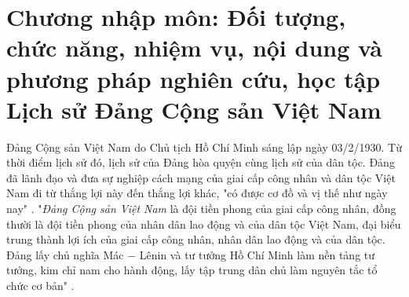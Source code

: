 \chapter{Chương nhập môn: Đối tượng, chức năng, nhiệm vụ, nội dung và phương pháp nghiên cứu, học tập Lịch sử Đảng Cộng sản Việt Nam}
Đảng Cộng sản Việt Nam do Chủ tịch Hồ Chí Minh sáng lập ngày 03/2/1930. Từ thời điểm lịch sử đó, lịch sử của Đảng hòa quyện cùng lịch sử của dân tộc. Đảng đã lãnh đạo và đưa sự nghiệp cách mạng của giai cấp công nhân và dân tộc Việt Nam đi từ thắng lợi này đến thắng lợi khác, "có được cơ đồ và vị thế như ngày nay" . "\textit{Đảng Cộng sản Việt Nam} là đội tiền phong của giai cấp công nhân, đồng thười là đội tiền phong của nhân dân lao động và của dân tộc Việt Nam, đại biểu trung thành lợi ích của giai cấp công nhân, nhân dân lao động và của dân tộc. Đảng lấy chủ nghĩa Mác $-$ Lênin và tư tưởng Hồ Chí Minh làm nền tảng tư tưởng, kim chỉ nam cho hành động, lấy tập trung dân chủ làm nguyên tắc tổ chức cơ bản" .